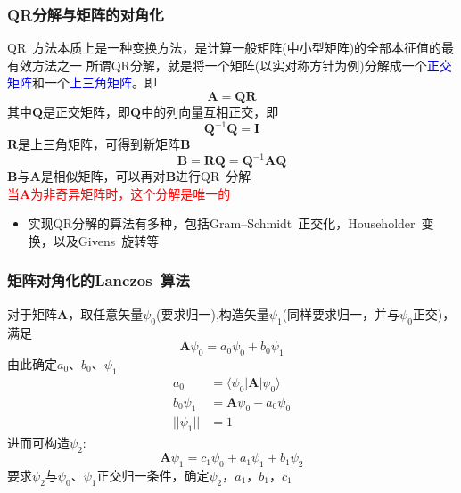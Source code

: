 \documentclass[cjk,slidestop,compress,mathserif,blue]{beamer}
\begin{document}
\frame
{
	\frametitle{\textrm{QR}分解与矩阵的对角化}
	\textrm{QR~}方法本质上是一种变换方法，是计算一般矩阵(中小型矩阵)的全部本征值的最有效方法之一
\vskip 5pt
	所谓\textrm{QR}分解，就是将一个矩阵(以实对称方针为例)分解成一个\textcolor{blue}{正交矩阵}和一个\textcolor{blue}{上三角矩阵}。即
	\begin{displaymath}
		\mathbf{A}=\mathbf{Q}\mathbf{R}
	\end{displaymath}
	其中$\mathbf{Q}$是正交矩阵，即$\mathbf{Q}$中的列向量互相正交，即
	\begin{displaymath}
		\mathbf{Q}^{-1}\mathbf{Q}=\mathbf{I} 
	\end{displaymath}
	$\mathbf{R}$是上三角矩阵，可得到新矩阵$\mathbf{B}$
	\begin{displaymath}
		\mathbf{B}=\mathbf{R}\mathbf{Q}=\mathbf{Q}^{-1}\mathbf{A}\mathbf{Q}
	\end{displaymath}
	$\mathbf{B}$与$\mathbf{A}$是相似矩阵，可以再对$\mathbf{B}$进行\textrm{QR~}分解\\
	\textcolor{red}{当$\mathbf{A}$为非奇异矩阵时，这个分解是唯一的}
	\begin{itemize}
		\item 实现\textrm{QR}分解的算法有多种，包括\textrm{Gram–Schmidt~}正交化，\textrm{Householder~}变换，以及\textrm{Givens~}旋转等
	\end{itemize}
}

\frame
{
	\frametitle{矩阵对角化的\textrm{Lanczos~}算法}
	对于矩阵$\mathbf{A}$，取任意矢量$\psi_0$(要求归一),构造矢量$\psi_1$(同样要求归一，并与$\psi_0$正交)，满足
	\begin{displaymath}
		\mathbf{A}\psi_0=a_0\psi_0+b_0\psi_1
	\end{displaymath}
	由此确定$a_0$、$b_0$、$\psi_1$
	\begin{displaymath}
		\begin{aligned}
			a_0&=\langle\psi_0|\mathbf{A}|\psi_0\rangle\\
			b_0\psi_1&=\mathbf{A}\psi_0-a_0\psi_0\\
			||\psi_1||&=1
		\end{aligned}
	\end{displaymath}
	进而可构造$\psi_2$:
	\begin{displaymath}
		\mathbf{A}\psi_1=c_1\psi_0+a_1\psi_1+b_1\psi_2
	\end{displaymath}
	要求$\psi_2$与$\psi_0$、$\psi_1$正交归一条件，确定$\psi_2$，$a_1$，$b_1$，$c_1$
}
\end{document}
